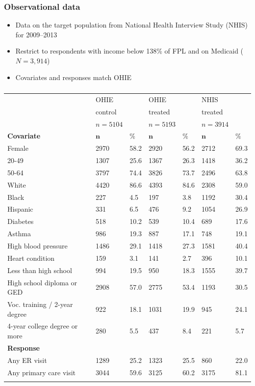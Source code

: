 \documentclass{beamer}
\begin{document}
\begin{frame}
\frametitle{Observational data}
\begin{itemize}
\item Data on the target population from National Health Interview Study (NHIS) \cite{NHIS} for 2009--2013
\item Restrict to respondents with income below 138\% of FPL and on Medicaid ($N=3,914$)
\item Covariates and responses match OHIE
\end{itemize}
\end{frame}

\begin{frame}
\frametitle{}
{\scriptsize
\begin{longtable}{lllllll}
  & OHIE &  & OHIE &  & NHIS &  \\ 
    & control &  & treated &  &treated &   \\ 
  & $n=5104$ &  & $n=5193$ &  & $n=3914$ &  \\  
  \hline   
    \hline   
 \textbf{Covariate} &  $\mathbf{n}$ & $\mathbf{\%}$ & $\mathbf{n}$ & $\mathbf{\%}$ & $\mathbf{n}$ & $\mathbf{\%}$ \\ 
\hline
Female & 2970 & 58.2 & 2920 & 56.2 & 2712 & 69.3  \\ 
   \hline
20-49 & 1307 & 25.6 & 1367 & 26.3 & 1418 & 36.2  \\ 
   \hline
50-64 & 3797 & 74.4 & 3826 & 73.7 & 2496 & 63.8 \\ 
   \hline
White & 4420 & 86.6 & 4393 & 84.6 & 2308 & 59.0  \\ 
   \hline
Black & 227 & 4.5 & 197 & 3.8 & 1192 & 30.4  \\ 
   \hline
Hispanic & 331 & 6.5 & 476 & 9.2 & 1054 & 26.9  \\ 
   \hline
Diabetes & 518 & 10.2 & 539 & 10.4 & 689 & 17.6 \\ 
   \hline
Asthma & 986 & 19.3 & 887 & 17.1 & 748 & 19.1  \\ 
   \hline
High blood pressure & 1486 & 29.1 & 1418 & 27.3 & 1581 & 40.4  \\ 
   \hline
Heart condition & 159 & 3.1 & 141 & 2.7 & 396 & 10.1 \\ 
   \hline
Less than high school  & 994 & 19.5 & 950 & 18.3 & 1555 & 39.7  \\ 
   \hline
High school diploma or GED & 2908 & 57.0 & 2775 & 53.4 & 1193 & 30.5 \\ 
   \hline
Voc. training / 2-year degree & 922 & 18.1 & 1031 & 19.9 & 945 & 24.1 \\ 
   \hline
4-year college degree or more & 280 & 5.5 & 437 & 8.4 & 221 & 5.7 \\ 
   \hline
\hline
 \textbf{Response} &   &  &  & &  &  \\ 
Any ER visit & 1289 & 25.2 & 1323 & 25.5 & 860 & 22.0  \\ 
   \hline
\hline
Any primary care visit & 3044 & 59.6 & 3125 & 60.2 & 3175 & 81.1 \\ 
\hline
\hline
\label{rct-nrt-compare}
\end{longtable}
}
\end{frame}
\end{document}
